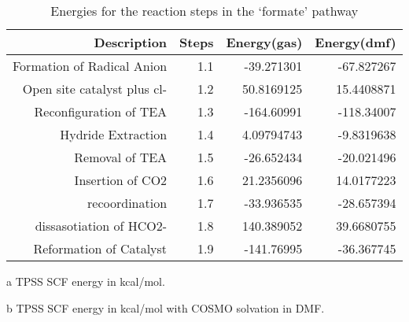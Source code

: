 \begin{table}[!htb]
\centering
 \begin{threeparttable}
  \caption{Energies for the reaction steps in the `formate' pathway}
    \begin{tabular}{rrrr}
    \toprule
    Description & Steps & Energy(gas)\tnote{a} & Energy(dmf)\tnote{b} \\
    \midrule
    Formation of Radical Anion & 1.1   & -39.271301 & -67.827267 \\
    Open site catalyst plus cl- & 1.2   & 50.8169125 & 15.4408871 \\
    Reconfiguration of TEA & 1.3   & -164.60991 & -118.34007 \\
    \midrule
    Hydride Extraction & 1.4   & 4.09794743 & -9.8319638 \\
    Removal of TEA & 1.5   & -26.652434 & -20.021496 \\
    Insertion of CO2 & 1.6   & 21.2356096 & 14.0177223 \\
    recoordination & 1.7   & -33.936535 & -28.657394 \\
    dissasotiation of HCO2- & 1.8   & 140.389052 & 39.6680755 \\
    Reformation of Catalyst & 1.9   & -141.76995 & -36.367745 \\
    \bottomrule
    \end{tabular}%
    \begin{tablenotes}
    \item [a] TPSS SCF energy in kcal/mol.
    \item [b] TPSS SCF energy in kcal/mol with COSMO solvation in DMF.
    \end{tablenotes}
  \label{tab.formrxn}%
 \end{threeparttable}
\end{table}%

